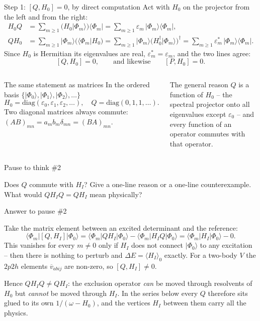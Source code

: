 \documentclass[aspectratio=169,10pt]{beamer}
\newcounter{thinkctr}
\newcommand{\thinkq}[2]{%
  \stepcounter{thinkctr}%
  \vfill
  \begin{tcolorbox}[enhanced,colback=palewarm,colframe=warm,boxrule=1.2pt,arc=4pt,
    grow to left by=6mm,grow to right by=6mm,
    left=16pt,right=16pt,top=16pt,bottom=18pt,
    fonttitle=\bfseries\Large,fontupper=\Large,
    title={Pause to think \#\thethinkctr\hfill\mdseries\normalsize(about #1 min -- discuss with your neighbour)}]
  #2
  \end{tcolorbox}
  \vfill}
\newcommand{\thinka}[1]{%
  \vfill
  \begin{tcolorbox}[enhanced,colback=paleteal,colframe=teal,boxrule=1.2pt,arc=4pt,
    grow to left by=6mm,grow to right by=6mm,
    left=16pt,right=16pt,top=16pt,bottom=18pt,
    fonttitle=\bfseries\Large,fontupper=\large,
    title={Answer to pause \#\thethinkctr}]
  #1
  \end{tcolorbox}
  \vfill}
\newcommand{\ket}[1]{\vert #1\rangle}
\newcommand{\bra}[1]{\langle #1\vert}
\newcommand{\ketbra}[2]{\vert #1\rangle\langle #2\vert}
\newcommand{\mel}[3]{\langle #1\lvert #2\rvert #3\rangle}
\newcommand{\av}[1]{\langle #1\rangle_0}
\newcommand{\vbar}[4]{\overline v_{#1#2#3#4}}
\newcommand{\ph}{\Phi_0}
\begin{document}
\begin{frame}[shrink=12]{Step 1: \([Q,H_0]=0\), by direct computation}
Act with \(H_0\) on the projector from the left and from the right:
\begin{align*}
H_0Q &= \sum_{m\ge1}\bigl(H_0\ket{\Phi_m}\bigr)\bra{\Phi_m}
      = \sum_{m\ge1}\varepsilon_m\,\ketbra{\Phi_m}{\Phi_m},\\[2pt]
QH_0 &= \sum_{m\ge1}\ket{\Phi_m}\bigl(\bra{\Phi_m}H_0\bigr)
      = \sum_{m\ge1}\ket{\Phi_m}\bigl(H_0^\dagger\ket{\Phi_m}\bigr)^\dagger
      = \sum_{m\ge1}\varepsilon_m^{*}\,\ketbra{\Phi_m}{\Phi_m}.
\end{align*}
Since \(H_0\) is Hermitian its eigenvalues are real, \(\varepsilon_m^*=\varepsilon_m\), and the two lines agree:
\[
\boxed{\;[Q,H_0]=0,\qquad\text{and likewise}\qquad [P,H_0]=0 .\;}
\]
\begin{columns}[T]
\begin{exampleblock}{The same statement as matrices}
In the ordered basis \(\{\ket{\ph},\ket{\Phi_1},\ket{\Phi_2},\dots\}\)
\[
H_0=\mathrm{diag}(\varepsilon_0,\varepsilon_1,\varepsilon_2,\dots),\quad
Q=\mathrm{diag}(0,1,1,\dots).
\]
Two diagonal matrices always commute: \((AB)_{mn}=a_mb_m\delta_{mn}=(BA)_{mn}\).
\end{exampleblock}
\begin{exampleblock}{The general reason}
\(Q\) is a function of \(H_0\) -- the spectral projector onto all eigenvalues except \(\varepsilon_0\) -- and every function of an operator commutes with that operator.
\end{exampleblock}
\end{columns}
\end{frame}

\begin{frame}{Pause to think \#2}
\thinkq{3}{Does \(Q\) commute with \(H_I\)? Give a one-line reason or a one-line counterexample. What would \(QH_IQ=QH_I\) mean physically?}
\end{frame}

\begin{frame}[shrink=5]{Answer to pause \#2}
\thinka{Take the matrix element between an excited determinant and the reference:
\[
\mel{\Phi_m}{[Q,H_I]}{\ph}
=\mel{\Phi_m}{QH_I}{\ph}-\mel{\Phi_m}{H_IQ}{\ph}
=\mel{\Phi_m}{H_I}{\ph}-0 .
\]
This vanishes for every \(m\ne0\) only if \(H_I\) does not connect \(\ket{\ph}\) to any excitation -- then there is nothing to perturb and \(\Delta E=\av{H_I}\) exactly. For a two-body \(V\) the \(2p2h\) elements \(\vbar{a}{b}{i}{j}\) are non-zero, so \([Q,H_I]\ne0\).

\medskip
Hence \(QH_IQ\ne QH_I\): the exclusion operator \emph{can} be moved through resolvents of \(H_0\) but \emph{cannot} be moved through \(H_I\). In the series below every \(Q\) therefore sits glued to its own \(1/(\omega-H_0)\), and the vertices \(H_I\) between them carry all the physics.}
\end{frame}
\end{document}

